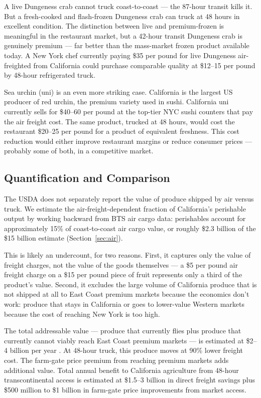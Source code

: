 A live Dungeness crab cannot truck coast-to-coast --- the 87-hour transit kills it.
But a fresh-cooked and flash-frozen Dungeness crab can truck at 48 hours in excellent
condition. The distinction between live and premium-frozen is meaningful in the restaurant
market, but a 42-hour transit Dungeness crab is genuinely premium --- far better than
the mass-market frozen product available today. A New York chef currently paying
\$35 per pound for live Dungeness air-freighted from California could purchase comparable
quality at \$12--15 per pound by 48-hour refrigerated truck.

Sea urchin (uni) is an even more striking case. California is the largest US producer of
red urchin, the premium variety used in sushi. California uni currently sells for
\$40--60 per pound at the top-tier NYC sushi counters that pay the air freight cost.
The same product, trucked at 48 hours, would cost the restaurant \$20--25 per pound for
a product of equivalent freshness. This cost reduction would either improve restaurant
margins or reduce consumer prices --- probably some of both, in a competitive market.

\subsection{Quantification and Comparison}

The USDA does not separately report the value of produce shipped by air versus truck.
We estimate the air-freight-dependent fraction of California's perishable output by
working backward from BTS air cargo data: perishables account for approximately 15\%
of coast-to-coast air cargo value, or roughly \$2.3 billion of the \$15 billion estimate
(Section~\ref{sec:air}).

This is likely an undercount, for two reasons. First, it captures only the value of
freight charges, not the value of the goods themselves --- a \$5 per pound air freight
charge on a \$15 per pound piece of fruit represents only a third of the product's
value. Second, it excludes the large volume of California produce that is not shipped
at all to East Coast premium markets because the economics don't work: produce that
stays in California or goes to lower-value Western markets because the cost of reaching
New York is too high.

The total addressable value --- produce that currently flies plus produce that currently
cannot viably reach East Coast premium markets --- is estimated at \$2--4 billion per
year \citep{USDA_NASS2023, BTS_airfreight2023}. At 48-hour truck, this produce moves
at 90\% lower freight cost. The farm-gate price premium from reaching premium markets
adds additional value. Total annual benefit to California agriculture from 48-hour
transcontinental access is estimated at \$1.5--3 billion in direct freight savings
plus \$500 million to \$1 billion in farm-gate price improvements from market access.

